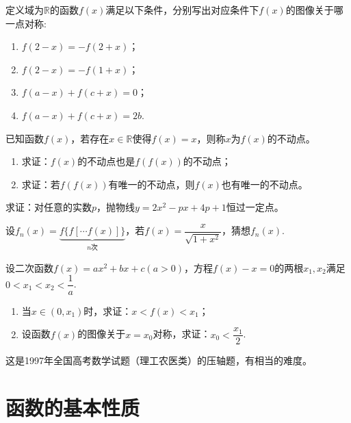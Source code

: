 \documentclass[lang=cn,math=cm,chinesefont=nofont,11pt,scheme=chinese,twocol]{elegantbook}
\begin{document}
\begin{exercise}
  定义域为$\mathbb{R}$的函数$f(x)$满足以下条件，分别写出对应条件下$f(x)$的图像关于哪一点对称:
\end{exercise}

\begin{enumerate}
  \item $f(2-x)=-f(2+x)$；
  \item $f(2-x)=-f(1+x)$；
  \item $f(a-x)+f(c+x)=0$；
  \item $f(a-x)+f(c+x)=2b$.
\end{enumerate}

\begin{exercise}
  已知函数$f(x)$，若存在$x\in\mathbb{R}$使得$f(x)=x$，则称$x$为$f(x)$的不动点。
\end{exercise}

\begin{enumerate}
  \item 求证：$f(x)$的不动点也是$f(f(x))$的不动点；
  \item 求证：若$f(f(x))$有唯一的不动点，则$f(x)$也有唯一的不动点。
\end{enumerate}

\begin{exercise}\label{ASJC_G1_P22.5}
  求证：对任意的实数$p$，抛物线$y=2x^2-px+4p+1$恒过一定点。
\end{exercise}

\begin{exercise}
  设$f_n(x)=\underbrace{f\{f[\cdots f(x)]\}}_{n\text{次}}$，若$f(x)=\dfrac{x}{\sqrt{1+x^2}}$，猜想$f_n(x)$.
\end{exercise}

\begin{exercise}
  设二次函数$f(x)=ax^{2}+bx+c(a>0)$，方程$f(x)-x=0$的两根$x_1,x_2$满足$0<x_1<x_2<\dfrac1a$.
\end{exercise}

\begin{enumerate}
  \item 当$x\in(0,x_1)$时，求证：$x<f(x)<x_1$；
  \item 设函数$f(x)$的图像关于$x=x_0$对称，求证：$x_0<\dfrac{x_1}{2}$.
\end{enumerate}

\begin{remark}
  这是1997年全国高考数学试题（理工农医类）的压轴题，有相当的难度。
\end{remark}

\section{函数的基本性质}
\end{document}

